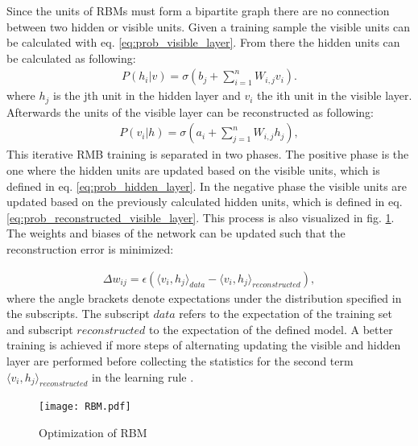 Since the units of RBMs must form a bipartite graph there are no connection between two hidden or visible units. Given a training sample the visible units can be calculated with eq. \ref{eq:prob_visible_layer}. From there the hidden units can be calculated as following:
\begin{equation}
\begin{aligned}
    P(h_{i}|v) = \sigma(b_{j} + \sum_{i=1}^{n} W_{i,j} v_{i}).
    \label{eq:prob_hidden_layer}
\end{aligned}
\end{equation}
where $h_{j}$ is the jth unit in the hidden layer and $v_{i}$ the ith unit in the visible layer. Afterwards the units of the visible layer can be reconstructed as following:
\begin{equation}
\begin{aligned}
    P(v_{i}|h) = \sigma(a_{i} + \sum_{j=1}^{n} W_{i,j} h_{j}),
    \label{eq:prob_reconstructed_visible_layer}
\end{aligned}
\end{equation}
This iterative RMB training is separated in two phases. The positive phase is the one where the hidden units are updated based on the visible units, which is defined in eq. \ref{eq:prob_hidden_layer}. In the negative phase the visible units are updated based on the previously calculated hidden units, which is defined in eq. \ref{eq:prob_reconstructed_visible_layer}. This process is also visualized in fig. \ref{fig:RBM}. The weights and biases of the network can be updated such that the reconstruction error is minimized:

\begin{equation}
\begin{aligned}
    \Delta w_{ij} = \epsilon(\langle v_{i}, h_{j}\rangle_{data}- \langle v_{i}, h_{j}\rangle_{reconstructed}), 
    \label{eq:RBM_weight_update}
\end{aligned}
\end{equation}
where the angle brackets denote expectations under the distribution specified in the subscripts. The subscript $data$ refers to the expectation of the training set and subscript $reconstructed$ to the expectation of the defined model. A better training is achieved if more steps of alternating updating the visible and hidden layer are performed before collecting the statistics for the second term $\langle v_{i}, h_{j}\rangle_{reconstructed}$ in the learning rule \cite{Hinton2010}.

\begin{figure}[htpb]
  \centering
  \texttt{[image: RBM.pdf]}
  \caption {Optimization of RBM} \label{fig:RBM}
\end{figure}
\FloatBarrier 

